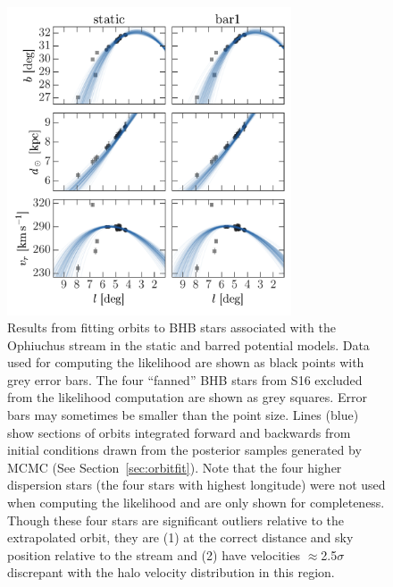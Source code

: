 \begin{figure}[!tbp]
\begin{center}
\includegraphics[width=0.75\textwidth]{figures/ch4/orbitfits}
\caption{ Results from fitting orbits to BHB stars associated with the Ophiuchus stream in the static and barred potential models. Data used for computing the likelihood are shown as black points with grey error bars. The four ``fanned'' BHB stars from S16 excluded from the likelihood computation are shown as grey squares. Error bars may sometimes be smaller than the point size. Lines (blue) show sections of orbits integrated forward and backwards from initial conditions drawn from the posterior samples generated by MCMC (See Section~\ref{sec:orbitfit}). Note that the four higher dispersion stars (the four stars with highest longitude) were not used when computing the likelihood and are only shown for completeness. Though these four stars are significant outliers relative to the extrapolated orbit, they are (1) at the correct distance and sky position relative to the stream and (2) have velocities $\approx$2.5$\sigma$ discrepant with the halo velocity distribution in this region.}
\label{fig:orbitfits}
\end{center}
\end{figure}

